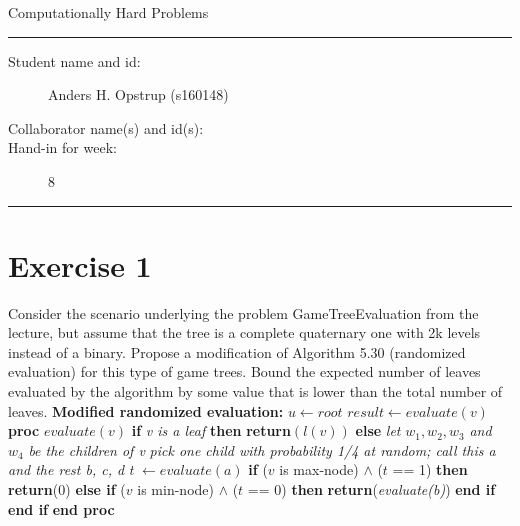 \documentclass[11pt]{article}
\newcommand\tab[1][0.5cm]{\hspace*{#1}}
\begin{document}
\begin{center}
{{\Large \sc Computationally Hard Problems}}
\end{center}
\rule{\textwidth}{1pt}
\begin{description}
\item[Student name and id:] Anders H. Opstrup (s160148)
\item[Collaborator name(s) and id(s):]
\item[Hand-in for week:] 8
\end{description}
\rule{\textwidth}{1pt}


\section*{Exercise 1}

Consider the scenario underlying the problem GameTreeEvaluation from the lecture, but assume that the tree is a complete quaternary one with 2k levels instead of a binary. Propose a modification of Algorithm 5.30 (randomized evaluation) for this type of game trees. Bound the expected number of leaves evaluated by the algorithm by some value that is lower than the total number of leaves. \newline \newline
\textbf{Modified randomized evaluation:} \newline \newline
$u \leftarrow root$ \newline
$result \leftarrow evaluate(v)$ \newline \newline
\textbf{proc} $evaluate(v)$ \newline
\textbf{if} \textit{v is a leaf} \textbf{then} \newline
\tab \textbf{return}$(l(v))$ \newline
\textbf{else} \newline
\tab \textit{let} $w_{1}, w_{2}, w_{3}$ \textit{and} $w_{4}$ \textit{be the children of v} \newline
\tab \textit{pick one child with probability 1/4 at random; call this a and the rest b, c, d} \newline
\tab \textit{t} $\leftarrow evaluate(a)$ \newline
\tab \textbf{if} ($v$ is max-node) $\land$ ($t$ == 1) \textbf{then} \newline
\tab \tab \textbf{return}(0) \newline
\tab \textbf{else if} ($v$ is min-node) $\land$ ($t$ == 0) \textbf{then} \newline
\tab \tab \textbf{return}(\textit{evaluate(b)}) \newline
\tab \textbf{end if} \newline
\textbf{end if} \newline
\textbf{end proc} \newline
\end{document}
